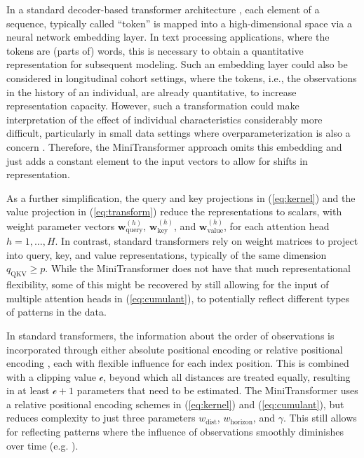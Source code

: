 \documentclass[AMA,Times1COL]{WileyNJDv5} %
\begin{document}
In a standard decoder-based transformer architecture \citep{vaswani_attention_2017}, each element of a sequence, typically called ``token'' is mapped into a high-dimensional space via a neural network embedding layer. In text processing applications, where the tokens are (parts of) words, this is necessary to obtain a quantitative representation for subsequent modeling. Such an embedding layer could also be considered in longitudinal cohort settings, where the tokens, i.e., the observations in the history of an individual, are already quantitative, to increase representation capacity. However, such a transformation could make interpretation of the effect of individual characteristics considerably more difficult, particularly in small data settings where overparameterization is also a concern \citep{barcelo_model_2020}. Therefore, the MiniTransformer approach omits this embedding and just adds a constant element to the input vectors to allow for shifts in representation.


As a further simplification, the query and key projections in (\ref{eq:kernel}) and the value projection in (\ref{eq:transform}) reduce the representations to scalars, with weight parameter vectors $\mathbf{w}_{\mathrm{query}}^{(h)}$, $\mathbf{w}_{\mathrm{key}}^{(h)}$, and $\mathbf{w}_{\mathrm{value}}^{(h)}$, for each attention head $h=1,\ldots,H$. In contrast, standard transformers rely on weight matrices to project into query, key, and value representations, typically of the same dimension $q_{\mathrm{QKV}} \geq p$. While the MiniTransformer does not have that much representational flexibility, some of this might be recovered by still allowing for the input of multiple attention heads in (\ref{eq:cumulant}), to potentially reflect different types of patterns in the data. 

In standard transformers, the information about the order of observations is incorporated through either absolute positional encoding \citep{vaswani_attention_2017} or relative positional encoding \citep{shaw_self-attention_2018}, each with flexible influence for each index position. This is combined with a clipping value $\mathscr{c}$, beyond which all distances are treated equally, resulting in at least $\mathscr{c} + 1$ parameters that need to be estimated. The MiniTransformer uses a relative positional encoding schemes in (\ref{eq:kernel}) and (\ref{eq:cumulant}), but reduces complexity to just three parameters $w_{\mathrm{dist}}$, $w_{\mathrm{horizon}}$, and $\gamma$. This still allows for reflecting patterns where the influence of observations smoothly diminishes over time (e.g. \citealp{setodji_exponential_2019,schilling_emotional_2022, li_generic_2022}). 
\end{document}
